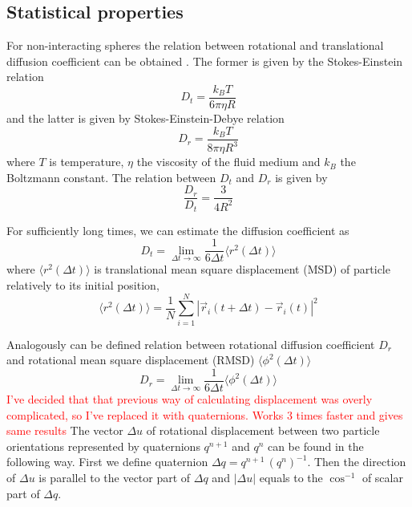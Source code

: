 \subsection{Statistical properties}
For non-interacting spheres the relation between rotational and translational diffusion coefficient can be obtained \cite{C5SM02754C}. The former is given by the Stokes-Einstein relation
\begin{equation}
\label{eq:translational_diffusion_coefficient}
	D_t = \frac{k_B T}{6 \pi \eta R}
\end{equation}
and the latter is given by Stokes-Einstein-Debye relation
\begin{equation}
\label{eq:rotational_diffusion_coefficient}
	D_r = \frac{k_B T}{8 \pi \eta R^3}
\end{equation}
where $T$ is temperature, $\eta$ the viscosity of the fluid medium and $k_B$ the Boltzmann constant. The relation between $D_t$ and $D_r$ is given by
\begin{equation}
	\frac{D_r}{D_t} = \frac{3}{4 R^2}
\end{equation}

For sufficiently long times, we can estimate the diffusion coefficient as
\begin{equation}
\label{eq:translation_diffusion_vs_displacement}
	D_t = \lim_{\Delta t \to \infty} \frac{1}{6 \Delta t} \langle r^2(\Delta t)\rangle
\end{equation}
where $\langle r^2(\Delta t)\rangle$ is translational mean square displacement (MSD) of particle relatively to its initial position,
\begin{equation}
	\langle r^2(\Delta t)\rangle
	 = \frac{1}{N} \sum_{i=1}^{N} |\vec{r}_i(t + \Delta t) - \vec{r}_i(t)|^2
\end{equation}

Analogously can be defined relation between rotational diffusion coefficient $D_r$ and rotational mean square displacement (RMSD) $\langle \phi^2(\Delta t) \rangle$
\begin{equation}
\label{eq:rotational_diffusion_vs_displacement}
	D_r = \lim_{\Delta t \to \infty} \frac{1}{6 \Delta t} \langle \phi^2(\Delta t)\rangle
\end{equation}
\textcolor{red}{I've decided that that previous way of calculating displacement was overly complicated, so I've replaced it with quaternions. Works 3 times faster and gives same results}
The vector $\Delta u$ of rotational displacement between two particle orientations represented by quaternions $q^{n+1}$ and $q^n$ can be found in the following way. First we define quaternion $\Delta q = q^{n+1}\, (q^n)^{-1}$. Then the direction of $\Delta u$ is parallel to the vector part of $\Delta q$ and $|\Delta u|$ equals to the $\cos^{-1}$ of scalar part of $\Delta q$.

